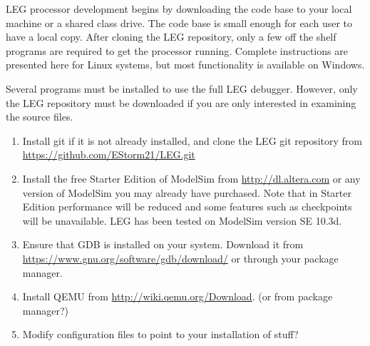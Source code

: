 LEG processor development begins by downloading the code base to your local machine or a shared class drive.
The code base is small enough for each user to have a local copy.
After cloning the LEG repository, only a few off the shelf programs are required to get the processor running.
Complete instructions are presented here for Linux systems, but most functionality is available on Windows.

Several programs must be installed to use the full LEG debugger. 
However, only the LEG repository must be downloaded if you are only interested in examining the source files.

\begin{enumerate}
\item Install git if it is not already installed, and clone the LEG git repository from \url{https://github.com/EStorm21/LEG.git}
\item Install the free Starter Edition of ModelSim from \url{http://dl.altera.com} or any version of ModelSim you may already have purchased. Note that in Starter Edition performance will be reduced and some features such as checkpoints will be unavailable. LEG has been tested on ModelSim version SE 10.3d. 
\item Ensure that GDB is installed on your system. Download it from \url{https://www.gnu.org/software/gdb/download/} or through your package manager.
\item Install QEMU from \url{http://wiki.qemu.org/Download}. (or from package manager?)
\item Modify configuration files to point to your installation of stuff?
\end{enumerate}

